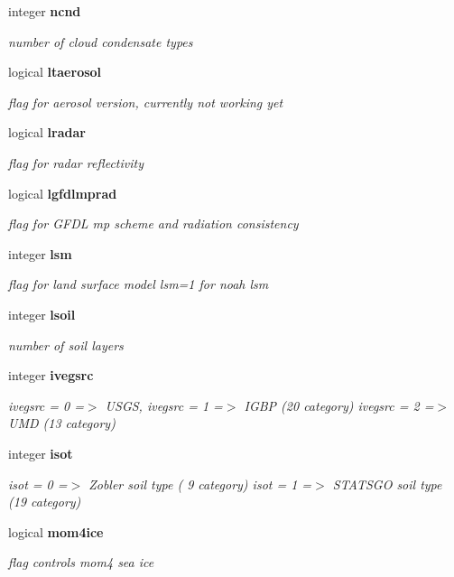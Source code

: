\begin{DoxyCompactItemize}
integer \textbf{ ncnd}
\begin{DoxyCompactList}\small\item\em number of cloud condensate types \end{DoxyCompactList}\item 
logical \textbf{ ltaerosol}
\begin{DoxyCompactList}\small\item\em flag for aerosol version, currently not working yet \end{DoxyCompactList}\item 
logical \textbf{ lradar}
\begin{DoxyCompactList}\small\item\em flag for radar reflectivity \end{DoxyCompactList}\item 
logical \textbf{ lgfdlmprad}
\begin{DoxyCompactList}\small\item\em flag for G\+F\+DL mp scheme and radiation consistency \end{DoxyCompactList}\item 
integer \textbf{ lsm}
\begin{DoxyCompactList}\small\item\em flag for land surface model lsm=1 for noah lsm \end{DoxyCompactList}\item 
integer \textbf{ lsoil}
\begin{DoxyCompactList}\small\item\em number of soil layers \end{DoxyCompactList}\item 
integer \textbf{ ivegsrc}
\begin{DoxyCompactList}\small\item\em ivegsrc = 0 =$>$ U\+S\+GS, ivegsrc = 1 =$>$ I\+G\+BP (20 category) ivegsrc = 2 =$>$ U\+MD (13 category) \end{DoxyCompactList}\item 
integer \textbf{ isot}
\begin{DoxyCompactList}\small\item\em isot = 0 =$>$ Zobler soil type ( 9 category) isot = 1 =$>$ S\+T\+A\+T\+S\+GO soil type (19 category) \end{DoxyCompactList}\item 
logical \textbf{ mom4ice}
\begin{DoxyCompactList}\small\item\em flag controls mom4 sea ice \end{DoxyCompactList}\item 

\end{DoxyCompactItemize}
